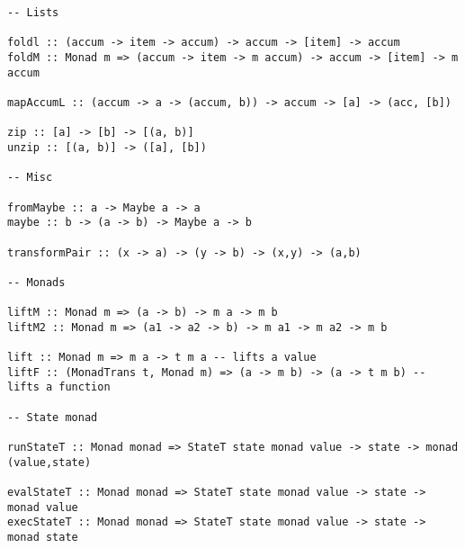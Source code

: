 \documentclass[a4wide]{article}
\begin{document}
\haskellsettings

\begin{lstlisting}
-- Lists

foldl :: (accum -> item -> accum) -> accum -> [item] -> accum
foldM :: Monad m => (accum -> item -> m accum) -> accum -> [item] -> m accum

mapAccumL :: (accum -> a -> (accum, b)) -> accum -> [a] -> (acc, [b])

zip :: [a] -> [b] -> [(a, b)]
unzip :: [(a, b)] -> ([a], [b])

-- Misc

fromMaybe :: a -> Maybe a -> a
maybe :: b -> (a -> b) -> Maybe a -> b

transformPair :: (x -> a) -> (y -> b) -> (x,y) -> (a,b)

-- Monads

liftM :: Monad m => (a -> b) -> m a -> m b
liftM2 :: Monad m => (a1 -> a2 -> b) -> m a1 -> m a2 -> m b

lift :: Monad m => m a -> t m a -- lifts a value
liftF :: (MonadTrans t, Monad m) => (a -> m b) -> (a -> t m b) -- lifts a function

-- State monad

runStateT :: Monad monad => StateT state monad value -> state -> monad (value,state)

evalStateT :: Monad monad => StateT state monad value -> state -> monad value
execStateT :: Monad monad => StateT state monad value -> state -> monad state
\end{lstlisting}
\end{document}
